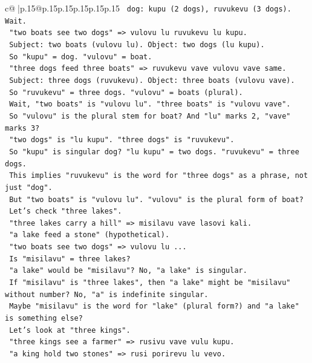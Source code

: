 \documentclass{article}
\begin{document}
{\begin{supertabular}{c@{$\;$}|p{.15\linewidth}@{}p{.15\linewidth}p{.15\linewidth}p{.15\linewidth}p{.15\linewidth}p{.15\linewidth}}
{{{\texttt{   dog: kupu (2 dogs), ruvukevu (3 dogs). Wait.} \\
\texttt{   "two boats see two dogs" => vulovu lu ruvukevu lu kupu.} \\
\texttt{   Subject: two boats (vulovu lu). Object: two dogs (lu kupu).} \\
\texttt{   So "kupu" = dog. "vulovu" = boat.} \\
\texttt{   "three dogs feed three boats" => ruvukevu vave vulovu vave same.} \\
\texttt{   Subject: three dogs (ruvukevu). Object: three boats (vulovu vave).} \\
\texttt{   So "ruvukevu" = three dogs. "vulovu" = boats (plural).} \\
\texttt{   Wait, "two boats" is "vulovu lu". "three boats" is "vulovu vave".} \\
\texttt{   So "vulovu" is the plural stem for boat? And "lu" marks 2, "vave" marks 3?} \\
\texttt{   "two dogs" is "lu kupu". "three dogs" is "ruvukevu".} \\
\texttt{   So "kupu" is singular dog? "lu kupu" = two dogs. "ruvukevu" = three dogs.} \\
\texttt{   This implies "ruvukevu" is the word for "three dogs" as a phrase, not just "dog".} \\
\texttt{   But "two boats" is "vulovu lu". "vulovu" is the plural form of boat?} \\
\texttt{   Let's check "three lakes".} \\
\texttt{   "three lakes carry a hill" => misilavu vave lasovi kali.} \\
\texttt{   "a lake feed a stone" (hypothetical).} \\
\texttt{   "two boats see two dogs" => vulovu lu ...} \\
\texttt{   Is "misilavu" = three lakes?} \\
\texttt{   "a lake" would be "misilavu"? No, "a lake" is singular.} \\
\texttt{   If "misilavu" is "three lakes", then "a lake" might be "misilavu" without number? No, "a" is indefinite singular.} \\
\texttt{   Maybe "misilavu" is the word for "lake" (plural form?) and "a lake" is something else?} \\
\texttt{   Let's look at "three kings".} \\
\texttt{   "three kings see a farmer" => rusivu vave vulu kupu.} \\
\texttt{   "a king hold two stones" => rusi porirevu lu vevo.} \\
}}}
\end{supertabular}}
\end{document}
